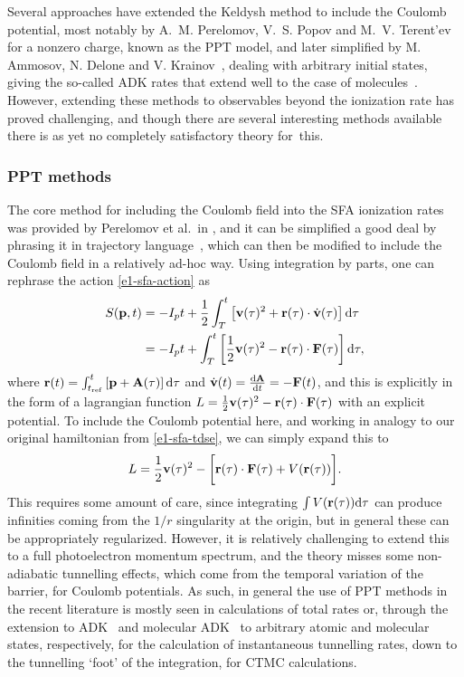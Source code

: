 Several approaches have extended the Keldysh method to include the Coulomb potential, most notably by A.~M. Perelomov, V.~S. Popov and M.~V. Terent'ev~\cite{perelomov_ionization_1966, perelomov_ionization-II_1967, perelomov_ionization-III_1967} for a nonzero charge, known as the PPT model, and later simplified by M. Ammosov, N. Delone and V. Krainov~\cite{ammosov-delone-krainov-1986}, dealing with arbitrary initial states, giving the so-called ADK rates that extend well to the case of molecules~\cite{tong_mo-adk_2002}. However, extending these methods to observables beyond the ionization rate has proved challenging, and though there are several interesting methods available there is as yet no completely satisfactory theory for~this.




\subsubsection{PPT methods}
The core method for including the Coulomb field into the SFA ionization rates was provided by Perelomov et al.\ in , and it can be simplified a good deal by phrasing it in trajectory language~, which can then be modified to include the Coulomb field in a relatively ad-hoc way. Using integration by parts, one can rephrase the action \eqref{e1-sfa-action} as
\begin{align}
S(\vb{p},t) 
&=
-I_p t+\frac 12 \int_{T}^{t} \left[\vb{v}(\tau)^2 + \vb{r}(\tau)\cdot \dot{\vb{v}}(\tau) \right] \mathrm{d}\tau
\nonumber \\ &=
-I_p t + \int_{T}^{t} \left[\frac 12 \vb{v}(\tau)^2 - \vb{r}(\tau)\cdot \vb{F}(\tau) \right] \mathrm{d}\tau
,
\label{e1-sfa-action-lagrangian}
\end{align}
where $\vb{r}(t)=\int_{t_\mathrm{ref}}^{t}\left[ \vb{p}+\vb{A}(\tau)\right] \mathrm{d}\tau$ and $\dot{\vb{v}}(t) = \frac{\mathrm{d}\vb{A}}{\mathrm{d} t} =-\vb{F}(t)$, and this is explicitly in the form of a lagrangian function $L=\frac 12 \vb{v}(\tau)^2 - \vb{r}(\tau)\cdot \vb{F}(\tau)$ with an explicit potential. To include the Coulomb potential here, and working in analogy to our original hamiltonian from \eqref{e1-sfa-tdse}, we can simply expand this to
\begin{equation}
L=\frac 12 \vb{v}(\tau)^2 - \bigg[ \vb{r}(\tau)\cdot \vb{F}(\tau) +V(\vb{r}(\tau)) \bigg].
\end{equation}
This requires some amount of care, since integrating $\int V(\vb{r}(\tau))\mathrm{d}\tau$ can produce infinities coming from the $1/r$ singularity at the origin, but in general these can be appropriately regularized. However, it is relatively challenging to extend this to a full photoelectron momentum spectrum, and the theory misses some non-adiabatic tunnelling effects, which come from the temporal variation of the barrier, for Coulomb potentials. As such, in general the use of PPT methods in the recent literature is mostly seen in calculations of total rates or, through the extension to ADK~\cite{ammosov-delone-krainov-1986} and molecular ADK~\cite{tong_mo-adk_2002} to arbitrary atomic and molecular states, respectively, for the calculation of instantaneous tunnelling rates, down to the tunnelling `foot' of the integration, for CTMC calculations. 



